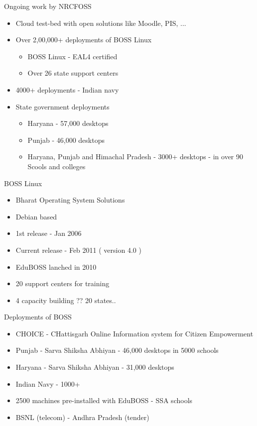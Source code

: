 \documentclass{beamer}
\begin{document}
	\begin{frame}{Ongoing work by NRCFOSS}
		\begin{itemize}[<+->]
			\item Cloud test-bed with open solutions like Moodle, PIS, ...
			\item Over 2,00,000+ deployments of BOSS Linux
				\begin{itemize}
				\item BOSS Linux - EAL4 certified
				\item Over 26 state support centers
				\end{itemize}
			\item 4000+ deployments - Indian navy
			\item State government deployments
				\begin{itemize}[<+->]
				\item Haryana - 57,000 desktops
				\item Punjab - 46,000 desktops
				\item Haryana, Punjab and Himachal Pradesh - 3000+ desktops - in over 90 Scools and colleges
				\end{itemize}
		\end{itemize}
	\end{frame}
	
	\begin{frame}{BOSS Linux}
		\begin{itemize}[<+->]
			\item Bharat Operating System Solutions
			\item Debian based
			\item 1st release - Jan 2006
			\item Current release - Feb 2011 ( version 4.0 )
			\item EduBOSS lanched in 2010
			\item 20 support centers for training
			\item 4 capacity building ?? 20 states..
		\end{itemize}
	\end{frame}
	
	\begin{frame}{Deployments of BOSS}
		\begin{itemize}
			\item CHOICE - CHattisgarh Online Information system for Citizen Empowerment
			\item Punjab - Sarva Shiksha Abhiyan - 46,000 desktops in 5000 schools
			\item Haryana - Sarva Shiksha Abhiyan - 31,000 desktops
			\item Indian Navy - 1000+ 
			\item 2500 machines pre-installed with EduBOSS - SSA schools
			\item BSNL (telecom) - Andhra Pradesh (tender)
		\end{itemize}
	\end{frame}
	
\end{document}
